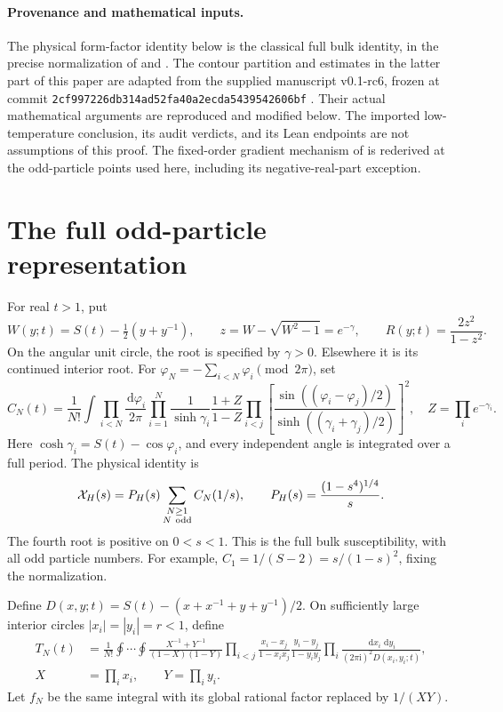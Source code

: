 \documentclass[11pt]{article}
\numberwithin{equation}{section}
\theoremstyle{definition}
\newcommand{\dd}{\,\mathrm d}
\newcommand{\ii}{\mathrm i}
\begin{document}
\paragraph{Provenance and mathematical inputs.}
The physical form-factor identity below is the classical full bulk
identity, in the precise normalization of \cite[eqs.~(1.9), (1.11),
(3.13), (3.17)--(3.20)]{Orrick2001} and \cite[eqs.~(3), (5)--(9)]{Boukraa2008}.
The contour partition and estimates in the latter part of this paper
are adapted from the supplied manuscript v0.1-rc6, frozen at commit
\texttt{2cf997226db314ad52fa40a2ecda5439542606bf} \cite{Snapshot}.
Their actual mathematical arguments are reproduced and modified below.
The imported low-temperature conclusion, its audit verdicts, and its
Lean endpoints are not assumptions of this proof. The fixed-order
gradient mechanism of \cite{TW2014} is rederived at the odd-particle
points used here, including its negative-real-part exception.

\tableofcontents

\section{The full odd-particle representation}\label{sec:setup}
For real $t>1$, put
\[
 W(y;t)=S(t)-\tfrac12(y+y^{-1}),\qquad
 z=W-\sqrt{W^2-1}=e^{-\gamma},\qquad
 R(y;t)=\frac{2z^2}{1-z^2}.
\]
On the angular unit circle, the root is specified by $\gamma>0$.
Elsewhere it is its continued interior root. For
$\varphi_N=-\sum_{i<N}\varphi_i\pmod{2\pi}$, set
\begin{equation}
 C_N(t)=\frac1{N!}\int\prod_{i<N}\frac{\dd\varphi_i}{2\pi}
 \prod_{i=1}^N\frac1{\sinh\gamma_i}
 \frac{1+Z}{1-Z}
 \prod_{i<j}\left[
 \frac{\sin((\varphi_i-\varphi_j)/2)}
      {\sinh((\gamma_i+\gamma_j)/2)}\right]^2,
 \quad Z=\prod_i e^{-\gamma_i}.
 \label{eq:angular}
\end{equation}
Here $\cosh\gamma_i=S(t)-\cos\varphi_i$, and every independent
angle is integrated over a full period. The physical identity is
\begin{equation}
 \mathcal X_H(s)=P_H(s)\sum_{\substack{N\ge1\\N\ {\rm odd}}}C_N(1/s),
 \qquad P_H(s)=\frac{(1-s^4)^{1/4}}s.
 \label{eq:bulk}
\end{equation}
The fourth root is positive on $0<s<1$. This is the full bulk
susceptibility, with all odd particle numbers. For example,
$C_1=1/(S-2)=s/(1-s)^2$, fixing the normalization.

Define $D(x,y;t)=S(t)-(x+x^{-1}+y+y^{-1})/2$. On sufficiently
large interior circles $|x_i|=|y_i|=r<1$, define
\begin{align}
 T_N(t)&=\frac1{N!}\oint\cdots\oint
 \frac{X^{-1}+Y^{-1}}{(1-X)(1-Y)}
 \prod_{i<j}\frac{x_i-x_j}{1-x_ix_j}\frac{y_i-y_j}{1-y_iy_j}
 \prod_i\frac{\dd x_i\,\dd y_i}{(2\pi\ii)^2D(x_i,y_i;t)},
 \label{eq:double}\\
 X&=\prod_i x_i,\qquad Y=\prod_i y_i.\nonumber
\end{align}
Let $f_N$ be the same integral with its global rational factor
replaced by $1/(XY)$.
\end{document}
